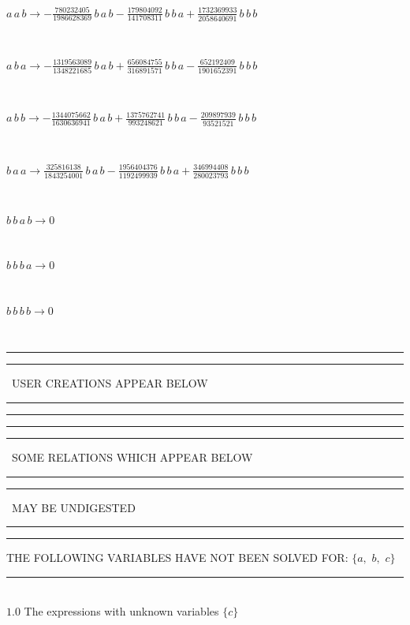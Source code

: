 \documentclass[rep10,leqno]{report}
\begin{document}
\begin{minipage}{6in}
$
a\,
 a\,
 b\rightarrow -\frac{780232405}{1986628369}\,
 b\,
 a\,
 b - \frac{179804092}{141708311}\,
 b\,
 b\,
 a + \frac{1732369933}{2058640691}\,
 b\,
 b\,
 b
$
\end{minipage}\medskip \\
\begin{minipage}{6in}
$
a\,
 b\,
 a\rightarrow -\frac{1319563089}{1348221685}\,
 b\,
 a\,
 b + \frac{656084755}{316891571}\,
 b\,
 b\,
 a - \frac{652192409}{1901652391}\,
 b\,
 b\,
 b
$
\end{minipage}\medskip \\
\begin{minipage}{6in}
$
a\,
 b\,
 b\rightarrow -\frac{1344075662}{1630636941}\,
 b\,
 a\,
 b + \frac{1375762741}{993248621}\,
 b\,
 b\,
 a - \frac{209897939}{93521521}\,
 b\,
 b\,
 b
$
\end{minipage}\medskip \\
\begin{minipage}{6in}
$
b\,
 a\,
 a\rightarrow \frac{325816138}{1843254001}\,
 b\,
 a\,
 b - \frac{1956404376}{1192499939}\,
 b\,
 b\,
 a + \frac{346994408}{280023793}\,
 b\,
 b\,
 b
$
\end{minipage}\medskip \\
\begin{minipage}{6in}
$
b\,
 b\,
 a\,
 b\rightarrow 0
$
\end{minipage}\medskip \\
\begin{minipage}{6in}
$
b\,
 b\,
 b\,
 a\rightarrow 0
$
\end{minipage}\medskip \\
\begin{minipage}{6in}
$
b\,
 b\,
 b\,
 b\rightarrow 0
$
\end{minipage}\\
\rule[2pt]{6in}{1pt}\hfil\break
\rule[2.5pt]{1.701in}{1pt}
\ USER CREATIONS APPEAR BELOW\ 
\rule[2.5pt]{1.701in}{1pt}\hfil\break
\rule[2pt]{6in}{1pt}\hfil\break
\rule[2pt]{6in}{4pt}\hfil\break
\rule[2pt]{1.45in}{4pt}
\ SOME RELATIONS WHICH APPEAR BELOW\ 
\rule[2pt]{1.45in}{4pt}\hfil\break
\rule[2pt]{2.18in}{4pt}
\ MAY BE UNDIGESTED\ 
\rule[2pt]{2.18in}{4pt}\hfil\break
\rule[2pt]{6in}{4pt}\hfil\break
THE FOLLOWING VARIABLES HAVE NOT BEEN SOLVED FOR:\hfil\break
$\{a,
$ $
b,
$ $
c\}$
\smallskip\\
\rule[3pt]{6in}{.7pt}\\
$1.0$  The expressions with unknown variables $\{c\}$\\
\end{document}
